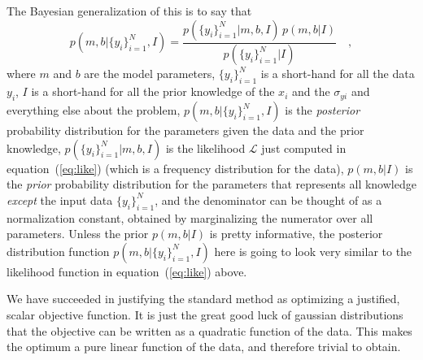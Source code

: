 \documentclass[12pt,twoside]{article}
\newcommand{\equationname}{equation}
\newcounter{problem}
\newcommand{\setofall}[3]{\{{#1}\}_{{#2}}^{{#3}}}
\newcommand{\ally}{\setofall{y_i}{i=1}{N}}
\newcommand{\like}{\mathscr{L}}
\begin{document}
The Bayesian generalization of this is to say that
\begin{equation}
p(m,b|\ally,I) = \frac{p(\ally|m,b,I)\,p(m,b|I)}{p(\ally|I)} \quad ,
\end{equation}
where $m$ and $b$ are the model parameters, $\ally$ is a short-hand
for all the data $y_i$, $I$ is a short-hand for all the prior
knowledge of the $x_i$ and the $\sigma_{yi}$ and everything else about
the problem, $p(m,b|\ally,I)$ is the \emph{posterior} probability
distribution for the parameters given the data and the prior
knowledge, $p(\ally|m,b,I)$ is the likelihood $\like$ just computed in
\equationname~(\ref{eq:like}) (which is a frequency distribution for
the data), $p(m,b|I)$ is the \emph{prior} probability distribution for
the parameters that represents all knowledge \emph{except} the input
data $\ally$, and the denominator can be thought of as a normalization
constant, obtained by marginalizing the numerator over all
parameters. Unless the prior $p(m,b|I)$ is pretty informative, the
posterior distribution function $p(m,b|\ally,I)$ here is going to look
very similar to the likelihood function in
\equationname~(\ref{eq:like}) above.

We have succeeded in justifying the standard method as optimizing a
justified, scalar objective function.  It is just the great good luck
of gaussian distributions that the objective can be written as a
quadratic function of the data.  This makes the optimum a pure linear
function of the data, and therefore trivial to obtain.
\end{document}
